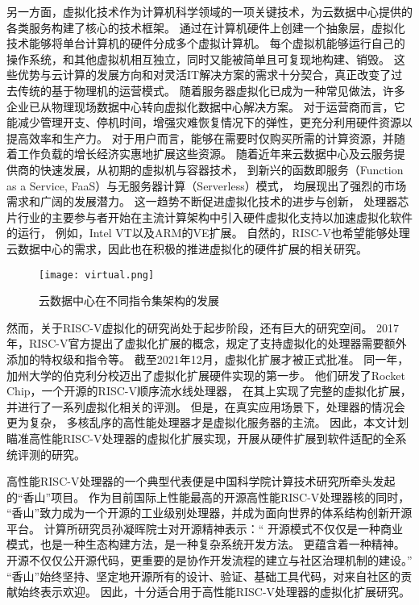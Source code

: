 另一方面，虚拟化技术作为计算机科学领域的一项关键技术，为云数据中心提供的各类服务构建了核心的技术框架。
通过在计算机硬件上创建一个抽象层，虚拟化技术能够将单台计算机的硬件分成多个虚拟计算机。
每个虚拟机能够运行自己的操作系统，和其他虚拟机相互独立，同时又能被简单且可复现地构建、销毁。
这些优势与云计算的发展方向和对灵活IT解决方案的需求十分契合，真正改变了过去传统的基于物理机的运营模式。
随着服务器虚拟化已成为一种常见做法，许多企业已从物理现场数据中心转向虚拟化数据中心解决方案。
对于运营商而言，它能减少管理开支、停机时间，增强灾难恢复情况下的弹性，更充分利用硬件资源以提高效率和生产力。
对于用户而言，能够在需要时仅购买所需的计算资源，并随着工作负载的增长经济实惠地扩展这些资源。
随着近年来云数据中心及云服务提供商的快速发展，从初期的虚拟机与容器技术，
到新兴的函数即服务（Function as a Service, FaaS）与无服务器计算（Serverless）模式，
均展现出了强烈的市场需求和广阔的发展潜力。
这一趋势不断促进虚拟化技术的进步与创新，
处理器芯片行业的主要参与者开始在主流计算架构中引入硬件虚拟化支持以加速虚拟化软件的运行，
例如，Intel VT\cite{intel-VT2005Computer}以及ARM的VE扩展\cite{armve2018}。
自然的，RISC-V也希望能够处理云数据中心的需求，因此也在积极的推进虚拟化的硬件扩展的相关研究。

\begin{figure}[htbp]
\centering
\texttt{[image: virtual.png]}
\caption{云数据中心在不同指令集架构的发展}
\end{figure}

然而，关于RISC-V虚拟化的研究尚处于起步阶段，还有巨大的研究空间。
2017年，RISC-V官方提出了虚拟化扩展的概念，规定了支持虚拟化的处理器需要额外添加的特权级和指令等。
截至2021年12月，虚拟化扩展才被正式批准。
同一年，加州大学的伯克利分校迈出了虚拟化扩展硬件实现的第一步。
他们研发了Rocket Chip\cite{itco2022rocket}，一个开源的RISC-V顺序流水线处理器，
在其上实现了完整的虚拟化扩展，并进行了一系列虚拟化相关的评测。
但是，在真实应用场景下，处理器的情况会更为复杂，
多核乱序的高性能处理器才是虚拟化服务器的主流。
因此，本文计划瞄准高性能RISC-V处理器的虚拟化扩展实现，开展从硬件扩展到软件适配的全系统评测的研究。

高性能RISC-V处理器的一个典型代表便是中国科学院计算技术研究所牵头发起的“香山”项目。
作为目前国际上性能最高的开源高性能RISC-V处理器核的同时，
“香山”致力成为一个开源的工业级别处理器，并成为面向世界的体系结构创新开源平台。
计算所研究员孙凝晖院士对开源精神表示：“
开源模式不仅仅是一种商业模式，也是一种生态构建方法，是一种复杂系统开发方法。
更蕴含着一种精神。开源不仅仅公开源代码，更重要的是协作开发流程的建立与社区治理机制的建设。”
“香山”始终坚持、坚定地开源所有的设计、验证、基础工具代码，对来自社区的贡献始终表示欢迎。
因此，十分适合用于高性能RISC-V处理器的虚拟化扩展研究。

